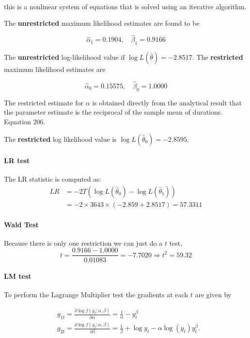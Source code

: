 \documentclass[11pt]{article}
\begin{document}
this is a nonlinear system of equations that is solved using an iterative algorithm.

The \textbf{unrestricted} maximum likelihood estimates are found to be

\[\widehat{\alpha}_1=0.1904, \quad \widehat{\beta}_1=0.9166\]

The \textbf{unrestricted} log-likelihood value if $\log L(\hat{\theta}) = -2.8517$. The \textbf{restricted} maximum likelihood estimates are

\[\widehat{\alpha}_0=0.15575, \quad \widehat{\beta}_0=1.0000\]

\begin{note}
    The restricted estimate for $\alpha$ is obtained directly from the analytical result that the parameter estimate is the reciprocal of the sample mean of durations. Equation 206.
\end{note}

The \textbf{restricted} log likelihood value is $\log L(\hat{\theta}_0)=-2.8595$.

\paragraph{LR test} \mbox{}
The LR statistic is computed as:
\begin{equation}
\begin{aligned}
L R & =-2 T\left(\log L\left(\widehat{\theta}_0\right)-\log L\left(\widehat{\theta}_1\right)\right) \\
& =-2 \times 3643 \times(-2.859+2.8517)=57.3311
\end{aligned}
\end{equation}

\paragraph{Wald Test} \mbox{}
Because there is only one restriction we can just do a $t$ test,
\begin{equation}
t=\frac{0.9166-1.0000}{0.01083}=-7.7020 \Rightarrow t^2=59.32
\end{equation}

\paragraph{LM test} \mbox{}

To perform the Lagrange Multiplier test the gradients at each $t$ are given by

\begin{equation}
\begin{aligned}
& g_{1 t}=\frac{\partial \log f\left(y_t ; \alpha, \beta\right)}{\partial \alpha}=\frac{1}{\alpha}-y_t^\beta \\
& g_{2 t}=\frac{\partial \log f\left(y_t ; \alpha, \beta\right)}{\partial \beta}=\frac{1}{\beta}+\log y_t-\alpha \log \left(y_t\right) y_t^\beta .
\end{aligned}
\end{equation}
\end{document}
